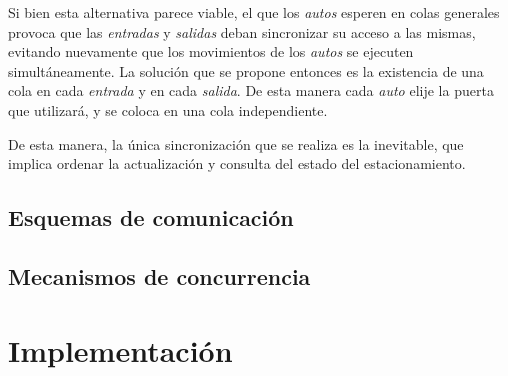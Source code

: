 \documentclass{article}
\begin{document}
        Si bien esta alternativa parece viable, el que los
        \emph{autos} esperen en colas generales provoca que las
        \emph{entradas} y \emph{salidas} deban sincronizar su
        acceso a las mismas, evitando nuevamente que los
        movimientos de los \emph{autos} se ejecuten 
        simultáneamente. La solución que se propone entonces es
        la existencia de una cola en cada \emph{entrada} y en
        cada \emph{salida}. De esta manera cada \emph{auto}
        elije la puerta que utilizará, y se coloca en una cola
        independiente.
        
        De esta manera, la única sincronización que se realiza
        es la inevitable, que implica ordenar la actualización
        y consulta del estado del estacionamiento.
        
    \subsection{Esquemas de comunicación}
    
    \subsection{Mecanismos de concurrencia}
    
\section{Implementación}
\end{document}
